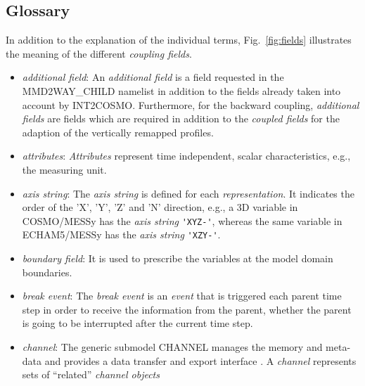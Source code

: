 \documentclass[11pt,twoside]{article}
\begin{document}
\begin{appendix}

\section*{\noindent Glossary}

In addition to the explanation of the individual terms,
Fig.\ \ref{fig:fields} illustrates the meaning of the different {\it
coupling fields}.

\begin{itemize}
\item {\it additional field}: An {\it additional field} is a field requested in
  the MMD2WAY\_CHILD namelist in addition to the fields already taken
  into account by INT2COSMO. Furthermore, for the backward coupling,
  {\it additional fields} are fields which are required in addition to
  the {\it coupled fields} for the adaption of the vertically remapped profiles.
\item {\it attributes}: {\it Attributes} represent time independent, scalar 
characteristics, e.g., the measuring unit.
\item {\it axis string}: The {\it axis string} is defined for each 
{\it representation}. It indicates the order of the 'X', 'Y', 'Z' and 'N' 
direction, e.g., a 3D variable in COSMO/MESSy
 has the {\it axis string}
\verb|'XYZ-'|, whereas the same variable in ECHAM5/MESSy has the 
{\it axis string}
\verb|'XZY-'|. 
\item {\it boundary field}: It is used to prescribe the variables at the 
model domain boundaries.
\item {\it break event}: The {\it break event} is an {\it event} that is 
  triggered each parent time step in order to receive the information from the
  parent, whether the parent is going to be interrupted after the current
 time step.
\item {\it channel}: The generic submodel CHANNEL manages the 
memory and meta-data and provides a data transfer and export interface 
\citep{Joeckel10a}.
A {\it channel} represents sets of ``related'' {\it channel objects}

\end{itemize}
\end{appendix}
\end{document}
